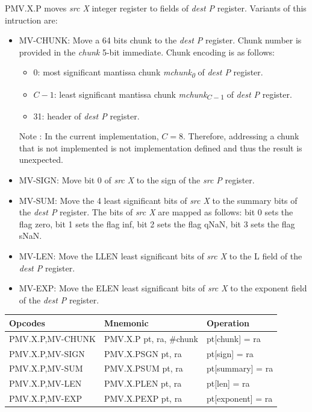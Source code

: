 PMV.X.P moves {\em src X} integer register to fields of {\em dest P} register.
Variants of this intruction are:
\begin{itemize}[topsep=0pt]
    \item MV-CHUNK: Move a 64 bits chunk to the {\em dest P} register.
    Chunk number is provided in the {\em chunk} 5-bit immediate.
    Chunk encoding is as follows:
        \begin{itemize}[noitemsep,topsep=0pt]
            \item 0: most significant mantissa chunk {\em mchunk\textsubscript{0}} of {\em dest P} register.
            \item $C-1$: least significant mantissa chunk {\em mchunk\textsubscript{$C-1$}} of {\em dest P} register.
            \item 31: header of {\em dest P} register.
        \end{itemize}
        Note : In the current implementation, $C=8$. Therefore, addressing a
        chunk that is not implemented is not implementation defined and thus the
        result is unexpected.
    \item MV-SIGN: Move bit 0 of {\em src X} to the sign of the {\em src P} register.
    \item MV-SUM: Move the 4 least significant bits of {\em src X} to the summary bits of the {\em dest P} register.
    The bits of {\em src X} are mapped as follows: bit 0 sets the flag zero, bit 1 sets the flag inf, bit 2 sets the flag qNaN, bit 3 sets the flag sNaN.
    \item MV-LEN: Move the LLEN least significant bits of {\em src X} to the L field of the {\em dest P} register.
    \item MV-EXP: Move the ELEN least significant bits of {\em src X} to the exponent field of the {\em dest P} register.
\end{itemize}

\begin{center}
    \begin{tabular}{|l|l|t|}
    \hline
    Opcodes   & Mnemonic & Operation \\
    \hline
    PMV.X.P,MV-CHUNK & PMV.X.P pt, ra, \#chunk & pt[chunk]    = ra \\
    \hline
    PMV.X.P,MV-SIGN  & PMV.X.PSGN pt, ra       & pt[sign]     = ra \\
    \hline
    PMV.X.P,MV-SUM   & PMV.X.PSUM pt, ra       & pt[summary]  = ra \\
    \hline
    PMV.X.P,MV-LEN   & PMV.X.PLEN pt, ra       & pt[len]      = ra \\
    \hline
    PMV.X.P,MV-EXP   & PMV.X.PEXP pt, ra       & pt[exponent] = ra \\
    \hline
    \end{tabular}
\end{center}

